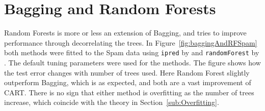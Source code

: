 \section{Bagging and Random Forests}
\label{sec:BaggandRFSim}
Random Forests is more or less an extension of Bagging, and tries to improve performance through decorrelating the trees. In Figure~\ref{fig:baggingAndRFSpam} both methods were fitted to the Spam data using \verb+ipred+ by \cite{ipred} and \verb+randomForest+ by \cite{randomForestR}. The default tuning parameters were used for the methods. The figure shows how the test error changes with number of trees used. Here Random Forest slightly outperform Bagging, which is as expected, and both are a vast improvement of CART. There is no sign that either method is overfitting as the number of trees increase, which coincide with the theory in Section~\ref{sub:Overfitting}.
\\
